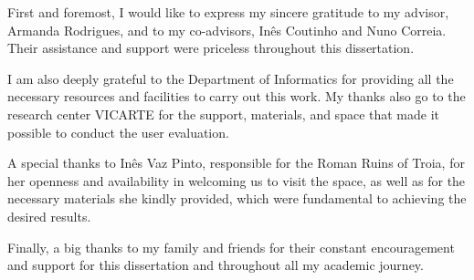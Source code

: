 
%

\begin{ntacknowledgements}

First and foremost, I would like to express my sincere gratitude to my advisor, Armanda Rodrigues, and to my co-advisors, Inês Coutinho and Nuno Correia. Their assistance and support were priceless throughout this dissertation.

I am also deeply grateful to the Department of Informatics for providing all the necessary resources and facilities to carry out this work. My thanks also go to the research center VICARTE for the support, materials, and space that made it possible to conduct the user evaluation.

A special thanks to Inês Vaz Pinto, responsible for the Roman Ruins of Troia, for her openness and availability in welcoming us to visit the space, as well as for the necessary materials she kindly provided, which were fundamental to achieving the desired results.

Finally, a big thanks to my family and friends for their constant encouragement and support for this dissertation and throughout all my academic journey.

\end{ntacknowledgements}